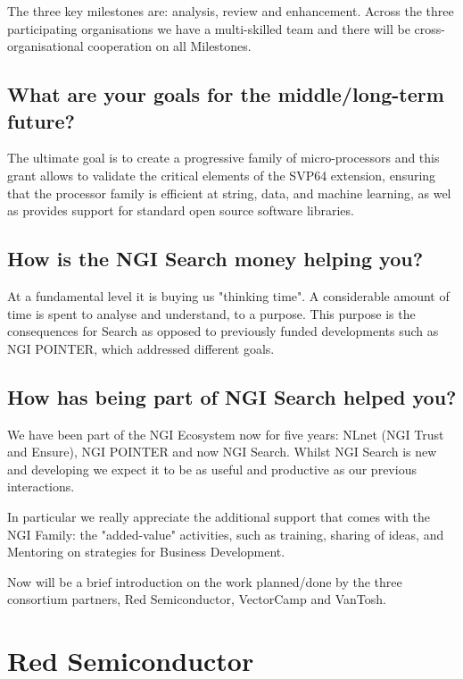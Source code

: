 The three key milestones are: analysis, review and enhancement.
Across the three participating organisations we have a multi-skilled
team and there will be cross-organisational cooperation on all Milestones.

\subsection{What are your goals for the middle/long-term future?}

The ultimate goal is to create a progressive family of micro-processors
and this grant allows to validate the critical elements of the
SVP64 extension, ensuring that the processor family is efficient at string,
data, and machine learning, as wel as provides support for standard open
source software libraries.

\subsection{How is the NGI Search money helping you?}

At a fundamental level it is buying us "thinking time".
A considerable amount of time is spent to analyse and understand,
to a purpose. This purpose is the consequences for Search as
opposed to previously funded developments such as NGI POINTER,
which addressed different goals.

\subsection{How has being part of NGI Search helped you?}

We have been part of the NGI Ecosystem now for five years:
NLnet (NGI Trust and Ensure), NGI POINTER and now NGI Search.
Whilst NGI Search is new and developing we expect it to be as
useful and productive as our previous interactions.

In particular we really appreciate the additional support that
comes with the NGI Family: the "added-value" activities, such
as training, sharing of ideas, and Mentoring on strategies for
Business Development.

Now will be a brief introduction on the work planned/done by the three
consortium partners, Red Semiconductor, VectorCamp and VanTosh.

\section{Red Semiconductor}

